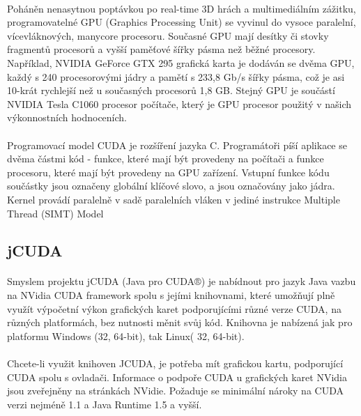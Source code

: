 \documentclass[bc,male,java,dept460]{diploma}		%
\begin{document}
\paragraph*{}
Poháněn nenasytnou poptávkou po real-time 3D hrách a multimediálním zážitku, programovatelné GPU (Graphics Processing Unit) se vyvinul do vysoce paralelní, vícevláknových, manycore procesoru. Současné GPU mají desítky či stovky fragmentů procesorů a vyšší paměťové šířky pásma než běžné procesory. Například, NVIDIA GeForce GTX 295 grafická karta je dodáván se dvěma GPU, každý s 240 procesorovými jádry a pamětí s 233,8 Gb/s šířky pásma, což je asi 10-krát rychlejší než u současných procesorů 1,8 GB. Stejný GPU je součástí NVIDIA Tesla C1060 procesor počítače, který je GPU procesor použitý v našich výkonnostních hodnoceních.

\paragraph*{}
Programovací model CUDA je rozšíření jazyka C. Programátoři píší aplikace se dvěma částmi kód - funkce, které mají být provedeny na počítači a funkce procesoru, které mají být provedeny na GPU zařízení. Vstupní funkce kódu součástky jsou označeny globální klíčové slovo, a jsou označovány jako jádra. Kernel provádí paralelně v sadě paralelních vláken v jediné instrukce Multiple Thread (SIMT) Model

\subsection{jCUDA}
\paragraph*{}
Smyslem projektu jCUDA (Java pro CUDA®) je nabídnout pro jazyk Java vazbu na NVidia CUDA framework spolu s jejími knihovnami, které umožňují plně využít výpočetní výkon grafických karet podporujícími různé verze CUDA, na různých platformách, bez nutnosti měnit svůj kód. Knihovna je nabízená jak pro platformu Windows (32, 64-bit), tak Linux( 32, 64-bit). 

\paragraph*{}
Chcete-li využit knihoven JCUDA, je potřeba mít grafickou kartu, podporující CUDA spolu s ovladači. Informace o podpoře CUDA u grafických karet NVidia jsou zveřejněny na stránkách NVidie. Požaduje se minimální nároky na CUDA verzi nejméně 1.1 a Java Runtime 1.5 a vyšší.
\end{document}
